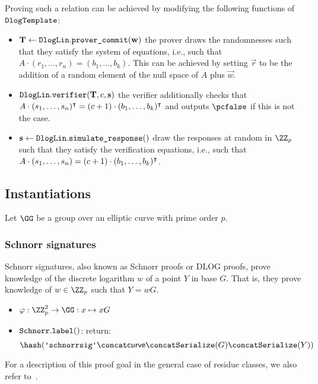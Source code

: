 \documentclass[11pt]{article}
\begin{document}
Proving such a relation can be achieved by modifying the following functions of $\texttt{DlogTemplate}$:
\begin{itemize}
  \item $\mathbf {T} \gets \texttt{DlogLin}.\texttt{prover\_commit}(\mathbf {w})$
    the prover draws the randomnesses such that they satisfy the system of equations, i.e., such that $A\cdot(r_1,\dots,r_n)=(b_1,\dots,b_k)$.
    This can be achieved by setting $\vec r$ to be the addition of a random element of the null space of $A$ plus $\vec w$.
  \item $\texttt{DlogLin}.\texttt{verifier}(\mathbf {T}, c, \mathbf {s})$
   the verifier additionally checks that $A\cdot(s_1,\dots,s_n)^\intercal=(c+1)\cdot(b_1,\dots,b_k)^\intercal$ and outputs $\reject$ if this is not the case.
  \item
    $\mathbf s \gets \texttt{DlogLin}.\texttt{simulate\_response}()$ draw the responses at random in $\ZZ_p$ such that they satisfy the verification equations, i.e., such that $A\cdot(s_1,\dots,s_n)=(c+1)\cdot(b_1,\dots,b_k)^\intercal$.
\end{itemize}

\subsection{Instantiations}
Let $\GG$ be a group over an elliptic curve with prime order $p$.

\subsubsection{Schnorr signatures}
Schnorr signatures, also known as Schnorr proofs or DLOG proofs, prove knowledge of the discrete logarithm $w$ of a point $Y$ in base $G$.
That is, they prove knowledge of $w\in\ZZ_p$ such that $Y=wG$.

\begin{itemize}
  \item $\varphi:\ZZ_p^2\to\GG:x\mapsto xG$
  \item $\texttt{Schnorr}.\texttt{label}()$: return:
  \[
    \hash(\schnorrlabel \concat \curvectx \concat \serialize(G) \concat \serialize(Y))
  \]
\end{itemize}

For a description of this proof goal in the general case of residue classes, we also refer to~\cite[1.4.1]{zkproof-reference}.
\end{document}
